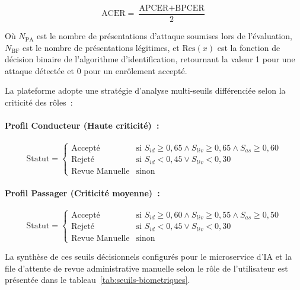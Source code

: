 \begin{equation}
\text{ACER} = \frac{\text{APCER} + \text{BPCER}}{2}
\end{equation}

Où $N_{\text{PA}}$ est le nombre de présentations d'attaque soumises lors de l'évaluation, $N_{\text{BF}}$ est le nombre de présentations légitimes, et $\text{Res}(x)$ est la fonction de décision binaire de l'algorithme d'identification, retournant la valeur 1 pour une attaque détectée et 0 pour un enrôlement accepté.

La plateforme adopte une stratégie d'analyse multi-seuils différenciée selon la criticité des rôles~:

\paragraph{Profil Conducteur (Haute criticité)~:}
\begin{equation}
\text{Statut} = \begin{cases} 
\text{Accepté} & \text{si } S_{id} \geq 0{,}65 \wedge S_{liv} \geq 0{,}65 \wedge S_{as} \geq 0{,}60 \\
\text{Rejeté} & \text{si } S_{id} < 0{,}45 \vee S_{liv} < 0{,}30 \\
\text{Revue Manuelle} & \text{sinon}
\end{cases}
\end{equation}

\paragraph{Profil Passager (Criticité moyenne)~:}
\begin{equation}
\text{Statut} = \begin{cases} 
\text{Accepté} & \text{si } S_{id} \geq 0{,}60 \wedge S_{liv} \geq 0{,}55 \wedge S_{as} \geq 0{,}50 \\
\text{Rejeté} & \text{si } S_{id} < 0{,}45 \vee S_{liv} < 0{,}30 \\
\text{Revue Manuelle} & \text{sinon}
\end{cases}
\end{equation}

La synthèse de ces seuils décisionnels configurés pour le microservice d'IA et la file d'attente de revue administrative manuelle selon le rôle de l'utilisateur est présentée dans le tableau~\ref{tab:seuils-biometriques}.

